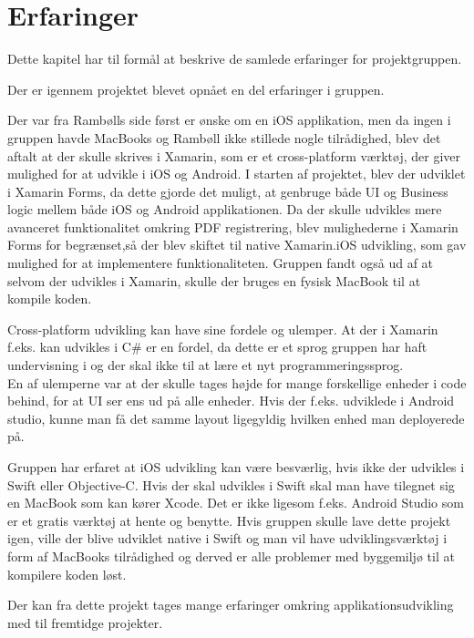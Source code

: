 \chapter{Erfaringer}
Dette kapitel har til formål at beskrive de samlede erfaringer for projektgruppen. 

Der er igennem projektet blevet opnået en del erfaringer i gruppen.

Der var fra Rambølls side først er ønske om en iOS applikation, men da ingen i gruppen havde MacBooks og Rambøll ikke stillede nogle tilrådighed, blev det aftalt at der skulle skrives i Xamarin, som er et cross-platform værktøj, der giver mulighed for at udvikle i iOS og Android.
I starten af projektet, blev der udviklet i Xamarin Forms, da dette gjorde det muligt, at genbruge både UI og Business logic mellem både iOS og Android applikationen. Da der skulle udvikles mere avanceret funktionalitet omkring PDF registrering, blev mulighederne i Xamarin Forms for begrænset\cite{Forms},så der blev skiftet til native Xamarin.iOS udvikling, som gav mulighed for at implementere funktionaliteten.
Gruppen fandt også ud af at selvom der udvikles i Xamarin, skulle der bruges en fysisk MacBook til at kompile koden.

Cross-platform udvikling kan have sine fordele og ulemper. At der i Xamarin f.eks. kan udvikles i C\# er en fordel, da dette er et sprog gruppen har haft undervisning i og der skal ikke til at lære et nyt programmeringssprog. \\
En af ulemperne var at der skulle tages højde for mange forskellige enheder i code behind, for at UI ser ens ud på alle enheder. Hvis der f.eks. udviklede i Android studio, kunne man få det samme layout ligegyldig hvilken enhed man deployerede på.

Gruppen har erfaret at iOS udvikling kan være besværlig, hvis ikke der udvikles i Swift\cite{Swift} eller Objective-C\cite{ObjC}. Hvis der skal udvikles i Swift skal man have tilegnet sig en MacBook som kan kører Xcode\cite{Xcode}. Det er ikke ligesom f.eks. Android Studio som er et gratis værktøj at hente og benytte.
Hvis gruppen skulle lave dette projekt igen, ville der blive udviklet native i Swift og man vil have udviklingsværktøj i form af MacBooks tilrådighed og derved er alle problemer med byggemiljø til at kompilere koden løst.

Der kan fra dette projekt tages mange erfaringer omkring applikationsudvikling med til fremtidge projekter. \\